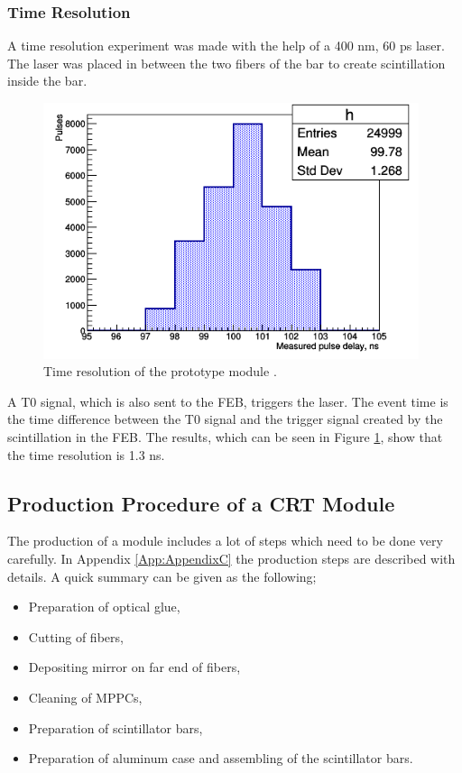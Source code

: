 \documentclass[a4paper]{article}\linespread{1.4}
\begin{document}
\subsubsection{Time Resolution}
A time resolution experiment was made with the help of a 400 nm, 60 ps laser. The laser was placed in between the two fibers of the bar to create scintillation inside the bar. 
\begin{figure}[h] \centering \includegraphics[width=110mm,scale=1.0]{figures/trs0.png} \caption{Time resolution of the prototype module \cite{E}.} \label{fig:trs0}\end{figure}
A T0 signal, which is also sent to the FEB, triggers the laser. The event time is the time difference between the T0 signal and the trigger signal created by the scintillation in the FEB. The results, which can be seen in Figure \ref{fig:trs0}, show that the time resolution is 1.3 ns.


\subsection{Production Procedure of a CRT Module}
The production of a module includes a lot of steps which need to be done very carefully. In Appendix \ref{App:AppendixC} the production steps are described with details. A quick summary can be given as the following;
\begin{itemize}
\item Preparation of optical glue,
\item Cutting of fibers,
\item Depositing mirror on far end of fibers,
\item Cleaning of MPPCs,
\item Preparation of scintillator bars,
\item Preparation of aluminum case and assembling of the scintillator bars.
\end{itemize}
\end{document}
